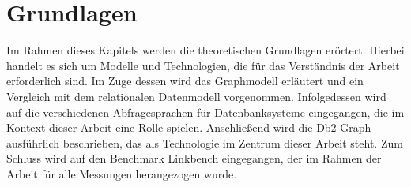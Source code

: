 \chapter{Grundlagen}
Im Rahmen dieses Kapitels werden die theoretischen Grundlagen erörtert. Hierbei handelt es sich um Modelle und Technologien, die für das Verständnis der Arbeit erforderlich sind. Im Zuge dessen wird das Graphmodell erläutert und ein Vergleich mit dem relationalen Datenmodell vorgenommen. Infolgedessen wird auf die verschiedenen Abfragesprachen für Datenbanksysteme eingegangen, die im Kontext dieser Arbeit eine Rolle spielen. Anschließend wird die Db2 Graph ausführlich beschrieben, das als Technologie im Zentrum dieser Arbeit steht. Zum Schluss wird auf den Benchmark Linkbench eingegangen, der im Rahmen der Arbeit für alle Messungen herangezogen wurde.




